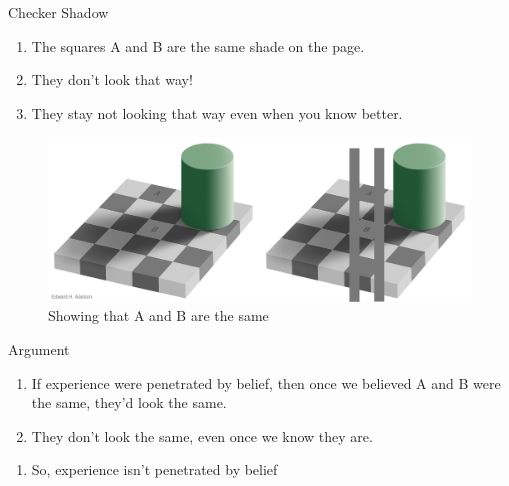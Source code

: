 \documentclass[
  17pt,
  letterpaper,
  ignorenonframetext,
  aspectratio=169,
  handout,
  xcolor={dvipsnames}]{beamer}
\providecommand{\tightlist}{%
  \setlength{\itemsep}{0pt}\setlength{\parskip}{0pt}}\usepackage{longtable,booktabs,array}
\begin{document}
\begin{frame}{Checker Shadow}
\protect\hypertarget{checker-shadow}{}
\begin{enumerate}[<+->]
\tightlist
\item
  The squares A and B are the same shade on the page.
\item
  They don't look that way!
\item
  They stay not looking that way even when you know better.
\end{enumerate}

\end{frame} \begin{frame}[plain]

\begin{figure}

{\centering \includegraphics[width=\textwidth,height=0.8\textheight]{../images/checkershadow_double.jpg}

}

\caption{Showing that A and B are the same}

\end{figure}
\end{frame}

\begin{frame}{Argument}
\protect\hypertarget{argument}{}
\begin{enumerate}[<+->]
\tightlist
\item
  If experience were penetrated by belief, then once we believed A and B
  were the same, they'd look the same.
\item
  They don't look the same, even once we know they are.
\end{enumerate}

\begin{enumerate}[<+->]
[A.]
\setcounter{enumi}{2}
\tightlist
\item
  So, experience isn't penetrated by belief
\end{enumerate}
\end{frame}
\end{document}
